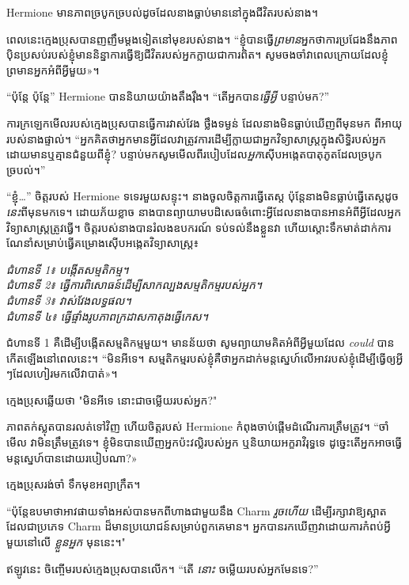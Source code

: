 Hermione មានភាពច្របូកច្របល់ដូចដែលនាងធ្លាប់មាននៅក្នុងជីវិតរបស់នាង។

ពេលនេះក្មេងប្រុសបានញញឹមម្តងទៀតនៅមុខរបស់នាង។ “ខ្ញុំបានធ្វើ\emph{ព្រមាន}អ្នកថាការប្រជែងនឹងភាពប៉ិនប្រសប់របស់ខ្ញុំមាននិន្នាការធ្វើឱ្យជីវិតរបស់អ្នកក្លាយជាការពិត។ សូម​ចងចាំ​វា​ពេល​ក្រោយ​ដែល​ខ្ញុំ​ព្រមាន​អ្នក​អំពី​អ្វី​មួយ»។

“ប៉ុន្តែ ប៉ុន្តែ” Hermione បាននិយាយយ៉ាងតឹងរ៉ឹង។ “តើអ្នកបាន\emph{ធ្វើអ្វី} បន្ទាប់មក?”

ការក្រឡេកមើលរបស់ក្មេងប្រុសបានធ្វើការវាស់វែង ថ្លឹងទម្ងន់ ដែលនាងមិនធ្លាប់ឃើញពីមុនមក ពីអាយុរបស់នាងផ្ទាល់។ “អ្នក​គិត​ថា​អ្នក​មាន​អ្វី​ដែល​វា​ត្រូវ​ការ​ដើម្បី​ក្លាយ​ជា​អ្នក​វិទ្យាសាស្ត្រ​ក្នុង​សិទ្ធិ​របស់​អ្នក​ដោយ​មាន​ឬ​គ្មាន​ជំនួយ​ពី​ខ្ញុំ? បន្ទាប់មកសូមមើលពីរបៀបដែល\emph{អ្នក}ស៊ើបអង្កេតបាតុភូតដែលច្របូកច្របល់។”

“ខ្ញុំ…” ចិត្តរបស់ Hermione ទទេរមួយសន្ទុះ។ នាងចូលចិត្តការធ្វើតេស្ត ប៉ុន្តែនាងមិនធ្លាប់ធ្វើតេស្តដូច\emph{នេះ}ពីមុនមកទេ។ ដោយ​ភ័យ​ខ្លាច នាង​បាន​ព្យាយាម​បដិសេធ​ចំពោះ​អ្វី​ដែល​នាង​បាន​អាន​អំពី​អ្វី​ដែល​អ្នក​វិទ្យាសាស្ត្រ​ត្រូវ​ធ្វើ។ ចិត្តរបស់នាងបានរំលងឧបករណ៍ ទប់ទល់នឹងខ្លួនវា ហើយស្តោះទឹកមាត់ដាក់ការណែនាំសម្រាប់ធ្វើគម្រោងស៊ើបអង្កេតវិទ្យាសាស្ត្រ៖

\emph{ជំហានទី 1៖ បង្កើតសម្មតិកម្ម។\\
ជំហានទី 2៖ ធ្វើការពិសោធន៍ដើម្បីសាកល្បងសម្មតិកម្មរបស់អ្នក។\\
ជំហានទី 3៖ វាស់វែងលទ្ធផល។\\
ជំហានទី ៤៖ ធ្វើផ្ទាំងរូបភាពក្រដាសកាតុងធ្វើកេស។}

ជំហានទី 1 គឺដើម្បីបង្កើតសម្មតិកម្មមួយ។ មាន​ន័យ​ថា សូម​ព្យាយាម​គិត​អំពី​អ្វី​មួយ​ដែល \emph{could} បាន​កើត​ឡើង​នៅ​ពេល​នេះ។ “មិនអីទេ។ សម្មតិកម្ម​របស់​ខ្ញុំ​គឺ​ថា​អ្នក​ដាក់​មន្ត​ស្នេហ៍​លើ​អាវ​របស់​ខ្ញុំ​ដើម្បី​ធ្វើ​ឲ្យ​អ្វី​ៗ​ដែល​ហៀរ​មក​លើ​វា​បាត់»។

ក្មេងប្រុសឆ្លើយថា "មិនអីទេ នោះជាចម្លើយរបស់អ្នក?"

ភាពតក់ស្លុតបានរលត់ទៅវិញ ហើយចិត្តរបស់ Hermione កំពុងចាប់ផ្តើមដំណើរការត្រឹមត្រូវ។ “ចាំមើល វាមិនត្រឹមត្រូវទេ។ ខ្ញុំ​មិន​បាន​ឃើញ​អ្នក​ប៉ះ​វល្លិ​របស់​អ្នក ឬ​និយាយ​អក្ខរាវិរុទ្ធ​ទេ ដូច្នេះ​តើ​អ្នក​អាច​ធ្វើ​មន្ត​ស្នេហ៍​បាន​ដោយ​របៀប​ណា?»

ក្មេងប្រុសរង់ចាំ ទឹកមុខអព្យាក្រឹត។

“ប៉ុន្តែឧបមាថាអាវផាយទាំងអស់បានមកពីហាងជាមួយនឹង Charm \emph{រួចហើយ} ដើម្បីរក្សាវាឱ្យស្អាត ដែលជាប្រភេទ Charm ដ៏មានប្រយោជន៍សម្រាប់ពួកគេមាន។ អ្នក​បាន​រក​ឃើញ​វា​ដោយ​ការ​កំពប់​អ្វី​មួយ​នៅ​លើ \emph{ខ្លួនអ្នក} មុននេះ។"

ឥឡូវនេះ ចិញ្ចើមរបស់ក្មេងប្រុសបានលើក។ “តើ \emph{នោះ} ចម្លើយរបស់អ្នកមែនទេ?”

